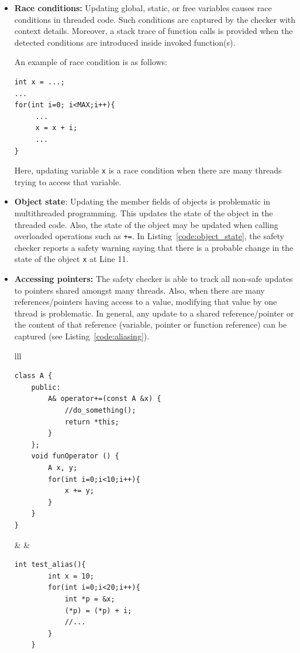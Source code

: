 \begin{itemize}
\item \textbf{Race conditions:} Updating global, static, or free variables causes race conditions in threaded code. Such conditions are captured by the checker with context details. Moreover, a stack trace of function calls is provided when the detected conditions are introduced inside invoked function(s).

An example of race condition is as follows:
\begin{lstlisting}[label=code:filtering_generated,caption={Race Condition}]
int x = ...;
...
for(int i=0; i<MAX;i++){
     ...
     x = x + i;
     ...
}
\end{lstlisting}
Here, updating variable \texttt{x} is a race condition when there are many threads trying to access that variable.

\item \textbf{Object state}: Updating the member fields of objects is problematic in multithreaded programming. This updates the state of the object in the threaded code. Also, the state of the object may be updated when calling overloaded operations such as \texttt{+=}. In Listing~\ref{code:object_state}, the safety checker reports a safety warning saying that there is a probable change in the state of the object \texttt{x} at Line 11.

\item \textbf{Accessing pointers:} The safety checker is able to track all non-safe updates to pointers shared amongst many threads. Also, when there are many references/pointers having access to a value, modifying that value by one thread is problematic. In general, any update to a shared reference/pointer or the content of that reference (variable, pointer or function reference) can be captured (see Listing~\ref{code:aliasing}).

\begin{tabular}{lll}
\noindent\begin{minipage}{.4\columnwidth}
\begin{lstlisting}[label=code:object_state,caption={Object State}]
class A {
    public:
        A& operator+=(const A &x) {
            //do_something();
            return *this;
        }
    };
    void funOperator () {
        A x, y;
        for(int i=0;i<10;i++){
            x += y;
        }
    }
}
\end{lstlisting}    
\end{minipage}
&
&
\noindent\begin{minipage}{.4\columnwidth}
\begin{lstlisting}[label=code:aliasing,caption={Aliasing}]
 int test_alias(){
        int x = 10;
        for(int i=0;i<20;i++){
            int *p = &x;
            (*p) = (*p) + i;
            //...
        }
    }
\end{lstlisting}
\end{minipage}
\end{tabular}


\end{itemize}
